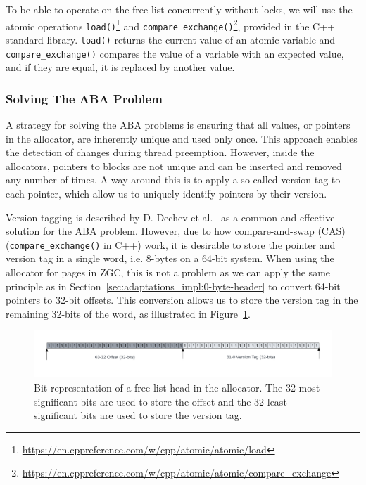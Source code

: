 To be able to operate on the free-list concurrently without locks, we will use the atomic operations \texttt{load()}\footnote{\url{https://en.cppreference.com/w/cpp/atomic/atomic/load}} and \texttt{compare\_exchange()}\footnote{\url{https://en.cppreference.com/w/cpp/atomic/atomic/compare_exchange}}, provided in the C++ standard library. \texttt{load()} returns the current value of an atomic variable and \texttt{compare\_exchange()} compares the value of a variable with an expected value, and if they are equal, it is replaced by another value.

\subsubsection{Solving The ABA Problem}
\label{sec:adaptations_impl:aba_problem}


A strategy for solving the ABA problems is ensuring that all values, or pointers in the allocator, are inherently unique and used only once. This approach enables the detection of changes during thread preemption. However, inside the allocators, pointers to blocks are not unique and can be inserted and removed any number of times. A way around this is to apply a so-called version tag to each pointer, which allow us to uniquely identify pointers by their version.

Version tagging is described by D. Dechev et al.~\cite{bjarne_aba} as a common and effective solution for the ABA problem. However, due to how compare-and-swap (CAS) (\texttt{compare\_exchange()} in C++) work, it is desirable to store the pointer and version tag in a single word, i.e. 8-bytes on a 64-bit system. When using the allocator for pages in ZGC, this is not a problem as we can apply the same principle as in Section~\ref{sec:adaptations_impl:0-byte-header} to convert 64-bit pointers to 32-bit offsets. This conversion allows us to store the version tag in the remaining 32-bits of the word, as illustrated in Figure~\ref{fig:concurrent_head_bits}.

\begin{figure}[H]
    \centering
    \includegraphics[width=1\textwidth]{figures/concurrent_head_bits.png}
    \caption{Bit representation of a free-list head in the allocator. The 32 most significant bits are used to store the offset and the 32 least significant bits are used to store the version tag.}
    \label{fig:concurrent_head_bits}
\end{figure}

